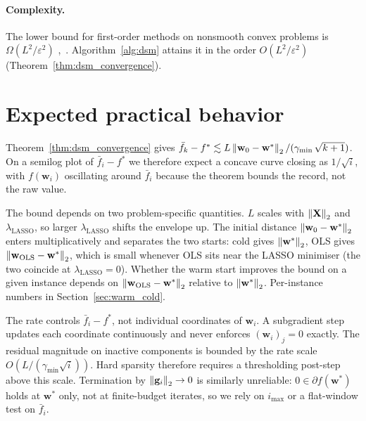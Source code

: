 \paragraph{Complexity.}
The lower bound for first-order methods on nonsmooth convex problems is $\Omega(L^2/\varepsilon^2)$ \cite[Slide 8]{frangioni-slides-nonsmooth},~\cite[Theorem~3.13]{bubeck2015convex}. Algorithm~\ref{alg:dsm} attains it in the order $O(L^2/\varepsilon^2)$ (Theorem~\ref{thm:dsm_convergence}).

\section{Expected practical behavior}
\label{sec:dsm_properties}

Theorem~\ref{thm:dsm_convergence} gives $\bar f_k - f^* \lesssim L\left\lVert \mathbf{w}_0 - \mathbf{w}^* \right\rVert_2 / (\gamma_{\min}\,\sqrt{k+1})$. On a semilog plot of $\bar f_i - f^*$ we therefore expect a concave curve closing as $1/\sqrt{i}$, with $f(\mathbf{w}_i)$ oscillating around $\bar f_i$ because the theorem bounds the record, not the raw value.

The bound depends on two problem-specific quantities. $L$ scales with $\left\lVert \mathbf{X} \right\rVert_2$ and $\lambda_{\text{LASSO}}$, so larger $\lambda_{\text{LASSO}}$ shifts the envelope up. The initial distance $\left\lVert \mathbf{w}_0 - \mathbf{w}^* \right\rVert_2$ enters multiplicatively and separates the two starts: cold gives $\left\lVert \mathbf{w}^* \right\rVert_2$, OLS gives $\left\lVert \mathbf{w}_{\mathrm{OLS}} - \mathbf{w}^* \right\rVert_2$, which is small whenever OLS sits near the LASSO minimiser (the two coincide at $\lambda_{\text{LASSO}} = 0$). Whether the warm start improves the bound on a given instance depends on $\left\lVert \mathbf{w}_{\mathrm{OLS}} - \mathbf{w}^* \right\rVert_2$ relative to $\left\lVert \mathbf{w}^* \right\rVert_2$. Per-instance numbers in Section~\ref{sec:warm_cold}.

The rate controls $\bar f_i - f^*$, not individual coordinates of $\mathbf{w}_i$. A subgradient step updates each coordinate continuously and never enforces $(\mathbf{w}_i)_j = 0$ exactly. The residual magnitude on inactive components is bounded by the rate scale $O(L/(\gamma_{\min}\sqrt{i}))$. Hard sparsity therefore requires a thresholding post-step above this scale. Termination by $\left\lVert \mathbf{g}_i \right\rVert_2 \to 0$ is similarly unreliable: $0 \in \partial f(\mathbf{w}^*)$ holds at $\mathbf{w}^*$ only, not at finite-budget iterates, so we rely on $i_{\max}$ or a flat-window test on $\bar f_i$.
